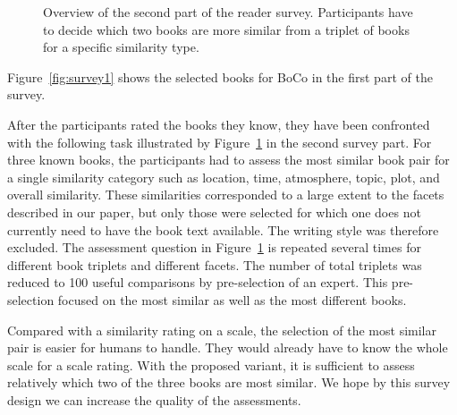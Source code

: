 \documentclass[11pt]{article}
\begin{document}
\begin{figure}
	\centering
	\caption{Overview of the second part of the reader survey. Participants have to decide which two books are more similar from a triplet of books for a specific similarity type.}
	\label{fig:survey2}
\end{figure}

Figure~\ref{fig:survey1} shows the selected books for BoCo in the first part of the survey.

After the participants rated the books they know, they have been confronted with the following task illustrated by Figure~\ref{fig:survey2} in the second survey part.
For three known books, the participants had to assess the most similar book pair for a single similarity category such as location, time, atmosphere, topic, plot, and overall similarity.
These similarities corresponded to a large extent to the facets described in our paper, but only those were selected for which one does not currently need to have the book text available. 
The writing style was therefore excluded.
The assessment question in Figure~\ref{fig:survey2} is repeated several times for different book triplets and different facets.
The number of total triplets was reduced to 100 useful comparisons by pre-selection of an expert.
This pre-selection focused on the most similar as well as the most different books.

Compared with a similarity rating on a scale, the selection of the most similar pair is easier for humans to handle.
They would already have to know the whole scale for a scale rating.
With the proposed variant, it is sufficient to assess relatively which two of the three books are most similar.
We hope by this survey design we can increase the quality of the assessments.
\end{document}
